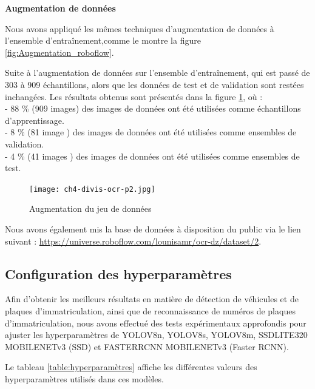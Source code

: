  
\textbf{Augmentation de données}

Nous avons appliqué les mêmes techniques d'augmentation de données à l'ensemble d'entraînement,comme le montre la figure \ref{fig:Augmentation_roboflow}.

Suite à l'augmentation de données sur l'ensemble d'entraînement, qui est passé de 303 à 909 échantillons, alors que les données de test et de validation sont restées inchangées. Les résultats obtenus sont présentés dans la figure \ref{fig:ch4-divis-ocr-p2}, où :\\
- 88 \% (909 images) des images de données ont été utilisées comme échantillons d'apprentissage.\\ 
- 8 \% (81 image ) des images de données ont été utilisées comme ensembles de validation. \\
- 4 \% (41 images ) des images de données ont été utilisées comme ensembles de test.
\begin{figure}[H]
	\centering
	\texttt{[image: ch4-divis-ocr-p2.jpg]}
	\caption{Augmentation du jeu de données}
\label{fig:ch4-divis-ocr-p2}
\end{figure}

Nous avons également mis la base de données à disposition du public via le lien suivant : \url{https://universe.roboflow.com/lounisamr/ocr-dz/dataset/2}.


\subsection{Configuration des hyperparamètres}
Afin d'obtenir les meilleurs résultats en matière de détection de véhicules et de plaques d'immatriculation, ainsi que de reconnaissance de numéros de plaques d'immatriculation, nous avons effectué des tests expérimentaux approfondis pour ajuster les hyperparamètres de YOLOV8n, YOLOV8s, YOLOV8m, SSDLITE320 MOBILENETv3 (SSD) et FASTERRCNN MOBILENETv3 (Faster RCNN).
\par Le tableau \ref{table:hyperparamètres} affiche les différentes valeurs des hyperparamètres utilisés dans ces modèles.

